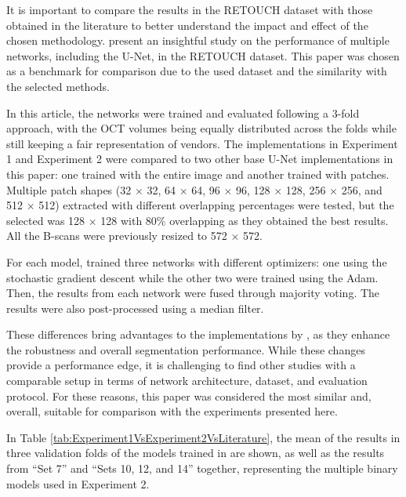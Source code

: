 \par
It is important to compare the results in the RETOUCH dataset with those obtained in the literature to better understand the impact and effect of the chosen methodology. \textcite{Alsaih2020} present an insightful study on the performance of multiple networks, including the U-Net, in the RETOUCH dataset. This paper was chosen as a benchmark for comparison due to the used dataset and the similarity with the selected methods. 
\par
In this article, the networks were trained and evaluated following a 3-fold approach, with the OCT volumes being equally distributed across the folds while still keeping a fair representation of vendors. The implementations in Experiment 1 and Experiment 2 were compared to two other base U-Net implementations in this paper: one trained with the entire image and another trained with patches. Multiple patch shapes (32 $\times$ 32, 64 $\times$ 64, 96 $\times$ 96, 128 $\times$ 128, 256 $\times$ 256, and 512 $\times$ 512) extracted with different overlapping percentages were tested, but the selected was 128 $\times$ 128 with 80\% overlapping as they obtained the best results. All the B-scans were previously resized to 572 $\times$ 572.
\par
For each model, \textcite{Alsaih2020} trained three networks with different optimizers: one using the stochastic gradient descent while the other two were trained using the Adam. Then, the results from each network were fused through majority voting. The results were also post-processed using a median filter.
\par
These differences bring advantages to the implementations by \textcite{Alsaih2020}, as they enhance the robustness and overall segmentation performance. While these changes provide a performance edge, it is challenging to find other studies with a comparable setup in terms of network architecture, dataset, and evaluation protocol. For these reasons, this paper was considered the most similar and, overall, suitable for comparison with the experiments presented here.
\par
In Table \ref{tab:Experiment1VsExperiment2VsLiterature}, the mean of the results in three validation folds of the models trained in \textcite{Alsaih2020} are shown, as well as the results from ``Set 7'' and ``Sets 10, 12, and 14'' together, representing the multiple binary models used in Experiment 2.

